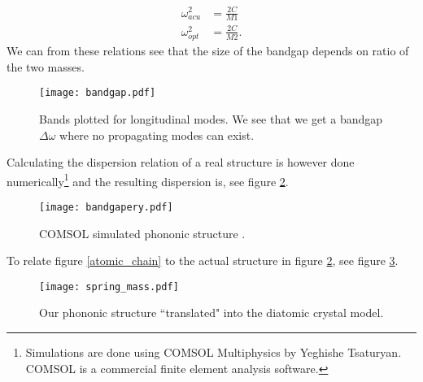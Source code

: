 \begin{align}
\omega_{acu}^2 & = \frac{2C}{M1} \\
\omega_{opt}^2 & = \frac{2C}{M2}.
\end{align}
\noindent
We can from these relations see that the size of the bandgap depends on ratio of the two masses.

\begin{figure}[H]
\centering
\texttt{[image: bandgap.pdf]}
\caption{Bands plotted for longitudinal modes. We see that we get a bandgap $\Delta\omega$ where no propagating modes can exist.}
\label{fig:bandgap}
\end{figure}

Calculating the dispersion relation of a real structure is however done numerically\footnote{Simulations are done using COMSOL Multiphysics by Yeghishe Tsaturyan. COMSOL is a commercial finite element analysis software.} and the resulting dispersion is, see figure \ref{fig:simulated_bandgap}.

\begin{figure}[H]
\centering
\texttt{[image: bandgapery.pdf]}
\caption{COMSOL simulated phononic structure \cite{tsaturyan2014}.}
\label{fig:simulated_bandgap}
\end{figure}
\noindent
To relate figure \ref{atomic_chain} to the actual structure in figure \ref{fig:simulated_bandgap}, see figure \ref{fig:spring_mass}.

\begin{figure}[H]
\centering
\texttt{[image: spring\_mass.pdf]}
\caption{Our phononic structure ``translated" into the diatomic crystal model.}
\label{fig:spring_mass}
\end{figure}